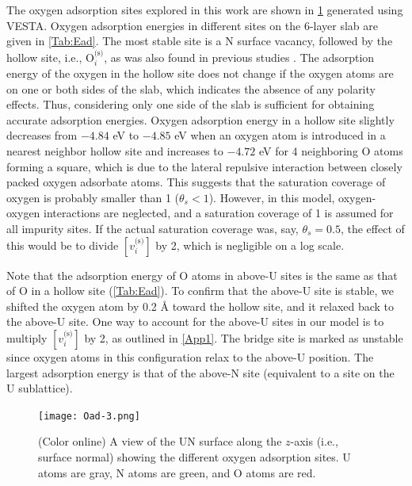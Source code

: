 \documentclass[preprint,12pt,sort&compress]{elsarticle}
\newcommand{\?}{\stackrel{?}{=}}
\begin{document}
The oxygen adsorption sites explored in this work are shown in \cref{Fig:Oad-2} generated using VESTA. Oxygen adsorption energies in different sites on the 6-layer slab are given in \cref{Tab:Ead}. The most stable site is a N surface vacancy, followed by the hollow site, i.e., $\text{O}_i^\text{(s)}$, as was also found in previous studies \cite{Kotomin2008, Bocharov2013}. The adsorption energy of the oxygen in the hollow site does not change if the oxygen atoms are on one or both sides of the slab, which indicates the absence of any polarity effects. Thus, considering only one side of the slab is sufficient for obtaining accurate adsorption energies. Oxygen adsorption energy in a hollow site slightly decreases from $-4.84$ eV to $-4.85$ eV when an oxygen atom is introduced in a nearest neighbor hollow site and increases to $-4.72$ eV for 4 neighboring O atoms forming a square, which is due to the lateral repulsive interaction between closely packed oxygen adsorbate atoms. This suggests that the saturation coverage of oxygen is probably smaller than 1 ($\theta_s < 1$). However, in this model, oxygen-oxygen interactions are neglected, and a saturation coverage of 1 is assumed for all impurity sites. If the actual saturation coverage was, say, $\theta_s = 0.5$, the effect of this would be to divide $[ v_i^\text{(s)} ]$ by 2, which is negligible on a log scale.

Note that the adsorption energy of O atoms in above-U sites is the same as that of O in a hollow site (\cref{Tab:Ead}). To confirm that the above-U site is stable, we shifted the oxygen atom by 0.2 {\AA} toward the hollow site, and it relaxed back to the above-U site. One way to account for the above-U sites in our model is to multiply $[ v_i^\text{(s)} ]$ by 2, as outlined in \ref{App1}. The bridge site is marked as unstable since oxygen atoms in this configuration relax to the above-U position. The largest adsorption energy is that of the above-N site (equivalent to a site on the U sublattice). %

\begin{figure}[h!]
    \centering
    \texttt{[image: Oad-3.png]}
    \caption{(Color online) A view of the UN surface along the $z$-axis (i.e., surface normal) showing the different oxygen adsorption sites. U atoms are gray, N atoms are green, and O atoms are red.}
    \label{Fig:Oad-2}
\end{figure}
\end{document}
